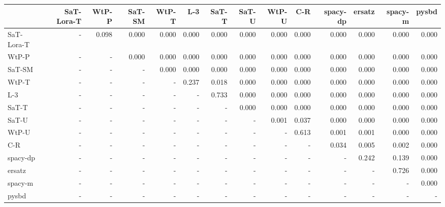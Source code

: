\begin{tabular}{lrrrrrrrrrrrrr}
\toprule
 & SaT-Lora-T & WtP-P & SaT-SM & WtP-T & L-3 & SaT-T & SaT-U & WtP-U & C-R & spacy-dp & ersatz & spacy-m & pysbd \\
\midrule
SaT-Lora-T & - & 0.098 & 0.000 & 0.000 & 0.000 & 0.000 & 0.000 & 0.000 & 0.000 & 0.000 & 0.000 & 0.000 & 0.000 \\
WtP-P & - & - & 0.000 & 0.000 & 0.000 & 0.000 & 0.000 & 0.000 & 0.000 & 0.000 & 0.000 & 0.000 & 0.000 \\
SaT-SM & - & - & - & 0.000 & 0.000 & 0.000 & 0.000 & 0.000 & 0.000 & 0.000 & 0.000 & 0.000 & 0.000 \\
WtP-T & - & - & - & - & 0.237 & 0.018 & 0.000 & 0.000 & 0.000 & 0.000 & 0.000 & 0.000 & 0.000 \\
L-3 & - & - & - & - & - & 0.733 & 0.000 & 0.000 & 0.000 & 0.000 & 0.000 & 0.000 & 0.000 \\
SaT-T & - & - & - & - & - & - & 0.000 & 0.000 & 0.000 & 0.000 & 0.000 & 0.000 & 0.000 \\
SaT-U & - & - & - & - & - & - & - & 0.001 & 0.037 & 0.000 & 0.000 & 0.000 & 0.000 \\
WtP-U & - & - & - & - & - & - & - & - & 0.613 & 0.001 & 0.001 & 0.000 & 0.000 \\
C-R & - & - & - & - & - & - & - & - & - & 0.034 & 0.005 & 0.002 & 0.000 \\
spacy-dp & - & - & - & - & - & - & - & - & - & - & 0.242 & 0.139 & 0.000 \\
ersatz & - & - & - & - & - & - & - & - & - & - & - & 0.726 & 0.000 \\
spacy-m & - & - & - & - & - & - & - & - & - & - & - & - & 0.000 \\
pysbd & - & - & - & - & - & - & - & - & - & - & - & - & - \\
\bottomrule
\end{tabular}

